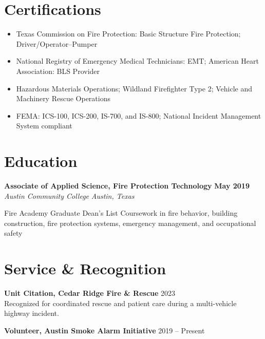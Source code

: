 \documentclass[10pt,letterpaper]{article}
\newcommand{\resumeentry}[4]{%
  \textbf{#1} \hfill \textbf{#2}\\[-0.05em]
  \textit{#3} \hfill \textit{#4}\par
}
\begin{document}
\section*{Certifications}
\begin{itemize}
  \item Texas Commission on Fire Protection: Basic Structure Fire Protection; Driver/Operator--Pumper
  \item National Registry of Emergency Medical Technicians: EMT; American Heart Association: BLS Provider
  \item Hazardous Materials Operations; Wildland Firefighter Type 2; Vehicle and Machinery Rescue Operations
  \item FEMA: ICS-100, ICS-200, IS-700, and IS-800; National Incident Management System compliant
\end{itemize}

\section*{Education}
\resumeentry{Associate of Applied Science, Fire Protection Technology}{May 2019}{Austin Community College}{Austin, Texas}
Fire Academy Graduate \textbar{} Dean's List \textbar{} Coursework in fire behavior, building construction, fire protection systems, emergency management, and occupational safety

\section*{Service \& Recognition}
\textbf{Unit Citation, Cedar Ridge Fire \& Rescue} \hfill 2023\\[-0.05em]
Recognized for coordinated rescue and patient care during a multi-vehicle highway incident.\par
\textbf{Volunteer, Austin Smoke Alarm Initiative} \hfill 2019 -- Present
\end{document}
